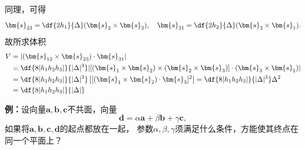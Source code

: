 同理，可得
$$\bm{s}_{23}=\df{2h_1}{\Delta}(\bm{s}_2\times\bm{s}_3),\quad
\bm{s}_{31}=\df{2h_2}{\Delta}(\bm{s}_3\times\bm{s}_1).$$
故所求体积
\begin{align*}
	V&=|(\bm{s}_{12}\times\bm{s}_{23})\cdot\bm{s}_{31}|\\
	&=\df{8|h_1h_2h_3|}{|\Delta|^3}|[(\bm{s}_1\times\bm{s}_2)\times(\bm{s}_2\times\bm{s}_3)]
	\cdot(\bm{s}_3\times\bm{s}_1)|\\
	&=\df{8|h_1h_2h_3|}{|\Delta|^3}
	\left|[(\bm{s}_1\times\bm{s}_2)\cdot\bm{s}_3]^2\right|
	=\df{8|h_1h_2h_3|}{|\Delta|^3}\Delta^2\\
	&=\df{8|h_1h_2h_3|}{|\Delta|}
\end{align*}

{\bf 例：}设向量$\bm{a},\bm{b},\bm{c}$不共面，向量
$$\bm{d}=\alpha\bm{a}+\beta\bm{b}+\gamma\bm{c},$$
如果将$\bm{a},\bm{b},\bm{c},\bm{d}$的起点都放在一起，
参数$\alpha,\beta,\gamma$须满足什么条件，方能使其终点在同一个平面上？



